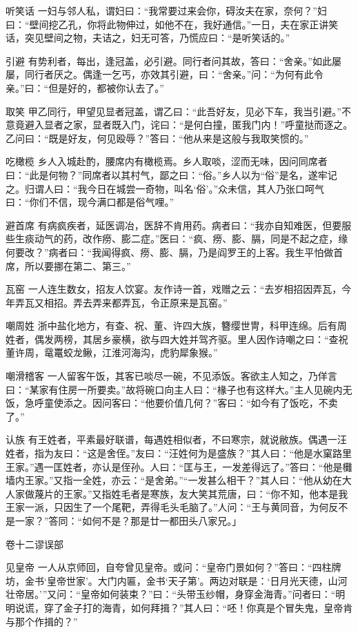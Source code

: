 \documentclass[12pt,UTF8]{ctexbook}
\begin{document}
听笑话
一妇与邻人私，谓妇曰：“我常要过来会你，碍汝夫在家，奈何？”妇曰：“壁间挖乙孔，你将此物伸过，如他不在，我好通信。”一日，夫在家正讲笑话，突见壁间之物，夫诘之，妇无可答，乃慌应曰：“是听笑话的。”

引避
有势利者，每出，逢冠盖，必引避。同行者问其故，答曰：“舍亲。”如此屡屡，同行者厌之。偶逢一乞丐，亦效其引避，曰：“舍亲。”问：“为何有此令亲。”曰：“但是好的，都被你认去了。”

取笑
甲乙同行，甲望见显者冠盖，谓乙曰：“此吾好友，见必下车，我当引避。”不意竟避入显者之家，显者既入门，诧曰：“是何白撞，匿我门内！”呼童挞而逐之。乙问曰：“既是好友，何见殴辱？”答曰：“他从来是这般与我取笑惯的。”

吃橄榄
乡人入城赴酌，腰席内有橄榄焉。乡人取啖，涩而无味，因问同席者曰：“此是何物？”同席者以其村气，鄙之曰：“俗。”乡人以为“俗”是名，遂牢记之。归谓人曰：“我今日在城尝一奇物，叫名‘俗’。”众未信，其人乃张口呵气曰：“你们不信，现今满口都是俗气哩。”

避首席
有病疯疾者，延医调冶，医辞不肯用药。病者曰：“我亦自知难医，但要服些生痰动气的药，改作痨、膨二症。”医曰：“疯、痨、膨、膈，同是不起之症，缘何要改？”病者曰：“我闻得疯、痨、膨、膈，乃是阎罗王的上客。我生平怕做首席，所以要挪在第二、第三。”

瓦窑
一人连生数女，招友人饮宴。友作诗一首，戏赠之云：“去岁相招因弄瓦，今年弄瓦又相招。弄去弄来都弄瓦，令正原来是瓦窑。”

嘲周姓
浙中盐化地方，有查、祝、董、许四大族，簪缨世冑，科甲连绵。后有周姓者，偶发两榜，其居乡豪横，欲与四大姓并驾齐驱。里人因作诗嘲之曰：“查祝董许周，鼋鼍蛟龙鳅，江淮河海沟，虎豹犀象猴。”

嘲滑稽客
一人留客午饭，其客已啖尽一碗，不见添饭。客欲主人知之，乃佯言曰：“某家有住房一所要卖。”故将碗口向主人曰：“椽子也有这样大。”主人见碗内无饭，急呼童使添之。因问客曰：“他要价值几何？”客曰：“如今有了饭吃，不卖了。”

认族
有王姓者，平素最好联谱，每遇姓相似者，不曰寒宗，就说敝族。偶遇一汪姓者，指为友曰：“这是舍侄。”友曰：“汪姓何为是盛族？”其人曰：“他是水窠路里王家。”遇一匡姓者，亦认是侄孙。人曰：“匡与王，一发差得远了。”答曰：“他是㰙墙内王家。”又指一全姓，亦云：“是舍弟。”“一发甚么相干？”其人曰：“他从幼在大人家做蔑片的王家。”又指姓毛者是寒族，友大笑其荒唐，曰：“你不知，他本是我王家一派，只因生了一个尾靶，弄得毛头毛脑了。”人问：“王与黄同音，为何反不是一家？”答同：“如何不是？那是廿一都田头八家兄。」

卷十二谬误部

见皇帝
一人从京师回，自夸曾见皇帝。或问：“皇帝门景如何？”答曰：“四柱牌坊，金书‘皇帝世家’。大门内匾，金书‘天子第’。两边对联是：‘日月光天德，山河壮帝居。’”又问：“皇帝如何装束？”曰：“头带玉纱帽，身穿金海青。”问者曰：“明明说谎，穿了金子打的海青，如何拜揖？”其人曰：“呸！你真是个冒失鬼，皇帝肯与那个作揖的？”
\end{document}
